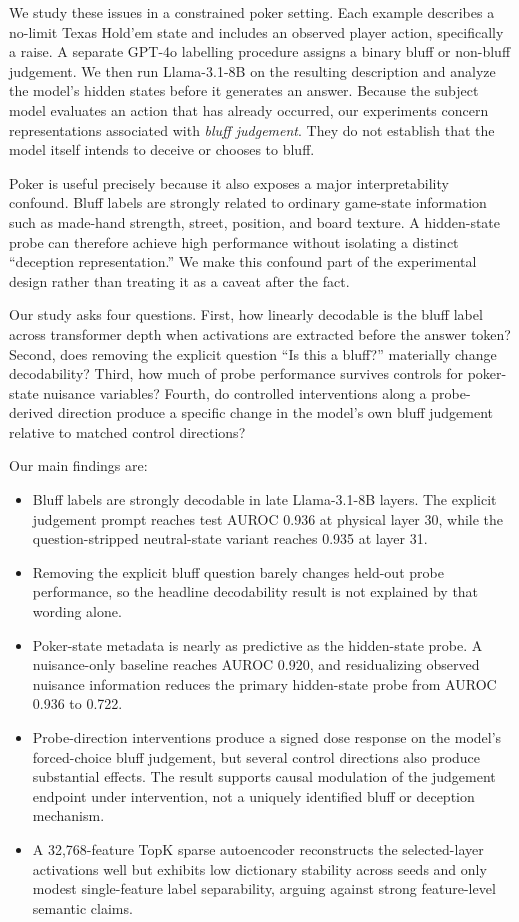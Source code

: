 We study these issues in a constrained poker setting. Each example describes a no-limit Texas Hold'em state and includes an observed player action, specifically a raise. A separate GPT-4o labelling procedure assigns a binary bluff or non-bluff judgement. We then run Llama-3.1-8B on the resulting description and analyze the model's hidden states before it generates an answer. Because the subject model evaluates an action that has already occurred, our experiments concern representations associated with \emph{bluff judgement}. They do not establish that the model itself intends to deceive or chooses to bluff.

Poker is useful precisely because it also exposes a major interpretability confound. Bluff labels are strongly related to ordinary game-state information such as made-hand strength, street, position, and board texture. A hidden-state probe can therefore achieve high performance without isolating a distinct ``deception representation.'' We make this confound part of the experimental design rather than treating it as a caveat after the fact.

Our study asks four questions. First, how linearly decodable is the bluff label across transformer depth when activations are extracted before the answer token? Second, does removing the explicit question ``Is this a bluff?'' materially change decodability? Third, how much of probe performance survives controls for poker-state nuisance variables? Fourth, do controlled interventions along a probe-derived direction produce a specific change in the model's own bluff judgement relative to matched control directions?

Our main findings are:
\begin{itemize}
    \item Bluff labels are strongly decodable in late Llama-3.1-8B layers. The explicit judgement prompt reaches test AUROC 0.936 at physical layer 30, while the question-stripped neutral-state variant reaches 0.935 at layer 31.
    \item Removing the explicit bluff question barely changes held-out probe performance, so the headline decodability result is not explained by that wording alone.
    \item Poker-state metadata is nearly as predictive as the hidden-state probe. A nuisance-only baseline reaches AUROC 0.920, and residualizing observed nuisance information reduces the primary hidden-state probe from AUROC 0.936 to 0.722.
    \item Probe-direction interventions produce a signed dose response on the model's forced-choice bluff judgement, but several control directions also produce substantial effects. The result supports causal modulation of the judgement endpoint under intervention, not a uniquely identified bluff or deception mechanism.
    \item A 32,768-feature TopK sparse autoencoder reconstructs the selected-layer activations well but exhibits low dictionary stability across seeds and only modest single-feature label separability, arguing against strong feature-level semantic claims.
\end{itemize}

